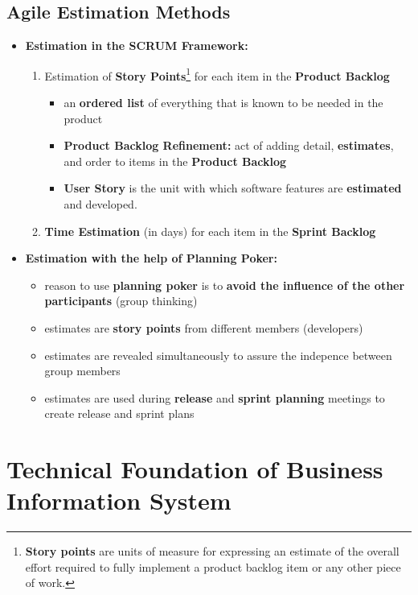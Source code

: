 \documentclass[ieeetran]{article}
\begin{document}
\subsection{Agile Estimation Methods} %
\label{sub:agile_estimation_methods}

\begin{itemize}
  \item \textbf{Estimation in the SCRUM Framework:}
	  \begin{enumerate}
		  \item Estimation of \textbf{Story Points}\footnote{\textbf{Story points} are units of measure for expressing an estimate of the overall effort required to fully implement a product backlog item or any other piece of work.} for each item in the \textbf{Product Backlog}
		    \begin{itemize}
			    \item an \textbf{ordered list} of everything that is known to be needed in the product
			\item \textbf{Product Backlog Refinement:} act of adding detail, \textbf{estimates}, and order to items in the \textbf{Product Backlog}
			\item \textbf{User Story} is the unit with which software features are \textbf{estimated} and developed.
		    \end{itemize}
		\item \textbf{Time Estimation} (in days) for each item in the \textbf{Sprint Backlog}
	  \end{enumerate}

\item \textbf{Estimation with the help of Planning Poker:}
\begin{itemize}
  \item reason to use \textbf{planning poker} is to \textbf{avoid the influence of the other participants} (group thinking)
\item estimates are \textbf{story points} from different members (developers)
\item estimates are revealed simultaneously to assure the indepence between group members
\item estimates are used during \textbf{release} and \textbf{sprint planning} meetings to create release and sprint plans
\end{itemize}
\end{itemize}




\section{Technical Foundation of Business Information System} %
\label{sec:technical_foundation_of_business_information_system}
\end{document}
